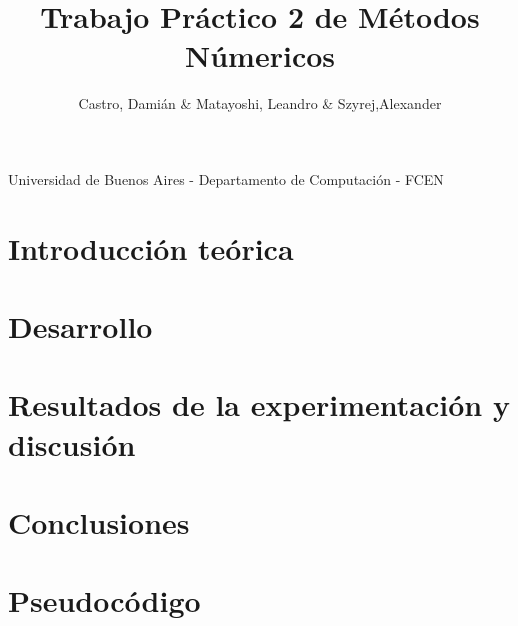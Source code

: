 \documentclass[a4paper,11pt]{article}
\title{Trabajo Práctico 2 de Métodos Númericos}
\author{Castro, Dami\'an \& Matayoshi, Leandro \& Szyrej,Alexander}
\begin{document}
\maketitle

\vspace{0.5 cm}

\begin{center}
	Universidad de Buenos Aires - Departamento de Computaci\'on - FCEN
\end{center}

\vspace{1 cm}



\newpage

\tableofcontents

\newpage

\section{Introducción teórica}



\section{Desarrollo}



\section{Resultados de la experimentación y discusión}



\section{Conclusiones}



\section{Pseudocódigo}


\end{document}
